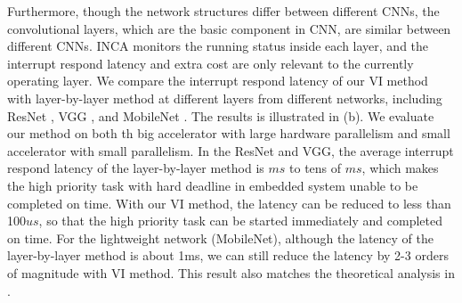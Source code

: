 Furthermore, though the network structures differ between different CNNs, the convolutional layers, which are the basic component in CNN, are similar between different CNNs. INCA monitors the running status inside each layer, and the interrupt respond latency and extra cost are only relevant to the currently operating layer. 
We compare the interrupt respond latency of our VI method with layer-by-layer method at different layers from different networks, including ResNet \cite{he2016deep}, VGG \cite{simonyan2014very}, and MobileNet \cite{howard2017mobilenets}. The results is illustrated in (b). We evaluate our method on both th big accelerator with large hardware parallelism and small accelerator with small parallelism. 
In the ResNet and VGG, the average interrupt respond latency of the layer-by-layer method is $ms$ to tens of $ms$, which makes the high priority task with hard deadline in embedded system unable to be completed on time. With our VI method, the latency can be reduced to less than 100$us$, so that the high priority task can be started immediately and completed on time. 
For the lightweight network (MobileNet), although the latency of the layer-by-layer method is about 1ms, we can still reduce the latency by 2-3 orders of magnitude with VI method. This result also matches the theoretical analysis in .




% 



